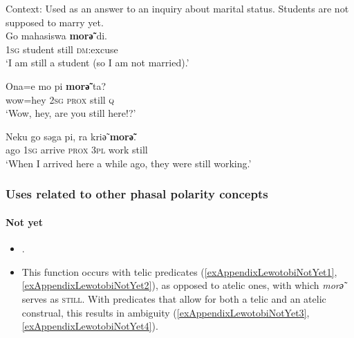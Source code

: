 \begin{exe}
	\ex\label{exAppendixLewotobi1}
	 Context: Used as an answer to an inquiry about marital status. Students are not supposed to marry yet.\\
	 \gll Go mahasiswa \textbf{morә̃} di.\\
	 1\textsc{sg} student still \textsc{dm}:excuse\\
	 \glt \lq I am still a student (so I am not married).' \parencite[434]{Nagaya2012}

	\ex\label{exAppendixLewotobi2}
	\gll Ona=e mo pi  \textbf{morә̃} ta?\\
	wow=hey 2\textsc{sg} \textsc{prox} still \textsc{q}\\
	\glt \lq Wow, hey, are you still here!?'  \parencite[206]{Nagaya2012}

	\ex\label{exAppendixLewotobi3}
	\gll Neku go səga pi, ra kriә̃ \textbf{morә̃}.\\
	ago   1\textsc{sg} arrive \textsc{prox} 3\textsc{pl} work still\\
	\glt \lq When I arrived here a while ago, they were still working.\rq{ }\parencite[450]{Nagaya2012}
\end{exe}

\subsubsection{Uses related to other phasal polarity concepts}
\paragraph{Not yet}\label{appendixLewotobiNotYet}
\begin{itemize}
	\item \textcite[415–416]{Nagaya2012}.
	\item This function occurs with telic predicates (\ref{exAppendixLewotobiNotYet1}, \ref{exAppendixLewotobiNotYet2}), as opposed to atelic ones, with which \textit{morә̃} serves as \textsc{still}. With predicates that allow for both a telic and an atelic construal, this results in ambiguity (\ref{exAppendixLewotobiNotYet3}, \ref{exAppendixLewotobiNotYet4}).
\end{itemize}

